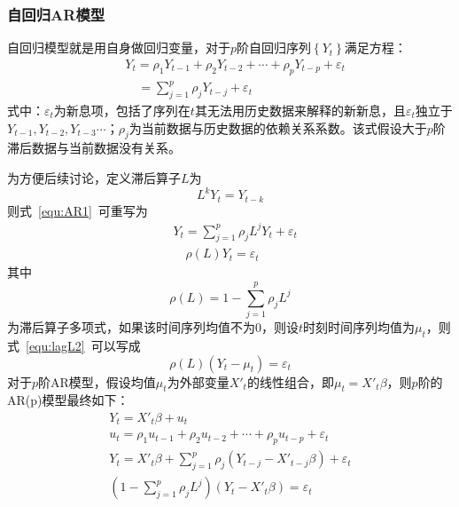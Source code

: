 \subsubsection{自回归AR模型}

自回归模型就是用自身做回归变量，对于$p$阶自回归序列$\left\{ {{Y}_{t}} \right\}$满足方程：
\begin{align}
  \label{equ:AR1}
  & {{Y}_{t}}={{\rho }_{1}}{{Y}_{t-1}}+{{\rho }_{2}}{{Y}_{t-2}}+\cdots +{{\rho }_{p}}{{Y}_{t-p}}+{{\varepsilon }_{t}} \\ 
 & \quad =\sum\limits_{j=1}^{p}{{{\rho }_{j}}{{Y}_{t-j}}}+{{\varepsilon }_{t}} \nonumber
\end{align}
式中：${\varepsilon }_{t}$为新息项，包括了序列在$t$其无法用历史数据来解释的新新息，且${\varepsilon }_{t}$独立于${{Y}_{t-1}},{{Y}_{t-2}},{{Y}_{t-3}}\cdots $；${\rho }_{j}$为当前数据与历史数据的依赖关系系数。该式假设大于$p$阶滞后数据与当前数据没有关系。

为方便后续讨论，定义滞后算子$L$为
\begin{equation}
	\label{equ:lagL}
	{{L}^{k}}{{Y}_{t}}={{Y}_{t-k}}
\end{equation}
则式~\ref{equ:AR1}~可重写为
\begin{align}
  & {{Y}_{t}}=\sum\limits_{j=1}^{p}{{{\rho }_{j}}{{L}^{j}}{{Y}_{t}}}+{{\varepsilon }_{t}} \\ 
  \label{equ:lagL2}
 & \quad \rho (L){{Y}_{t}}={{\varepsilon }_{t}}
\end{align}
其中
\begin{equation}
	\label{equ:AR3}
	\rho (L)=1-\sum\limits_{j=1}^{p}{{{\rho }_{j}}{{L}^{j}}}
\end{equation}
为滞后算子多项式，如果该时间序列均值不为0，则设$t$时刻时间序列均值为${{\mu }_{t}}$，则式~\ref{equ:lagL2}~可以写成
\begin{equation}
	\rho (L)({{Y}_{t}}-{{\mu }_{t}})={{\varepsilon }_{t}}
\end{equation}
对于$p$阶AR模型，假设均值${{\mu }_{t}}$为外部变量${X'}_{t}$的线性组合，即${{\mu }_{t}}={{{X}'}_{t}}\beta $，则$p$阶的AR(p)模型最终如下：
\begin{gather}
  	{{Y}_{t}}={{{{X}'}}_{t}}\beta +{{u}_{t}} \\ 
 	{{u}_{t}}={{\rho }_{1}}{{u}_{t-1}}+{{\rho }_{2}}{{u}_{t-2}}+\cdots +{{\rho }_{p}}{{u}_{t-p}}+{{\varepsilon }_{t}} \\ 
 	{{Y}_{t}}={{{{X}'}}_{t}}\beta +\sum\limits_{j=1}^{p}{{{\rho }_{j}}({{Y}_{t-j}}-{{{{X}'}}_{t-j}}\beta )+}{{\varepsilon }_{t}} \\ 
 	\left( 1-\sum\limits_{j=1}^{p}{{{\rho }_{j}}{{L}^{j}}} \right)({{Y}_{t}}-{{{{X}'}}_{t}}\beta )={{\varepsilon }_{t}} 
\end{gather}


